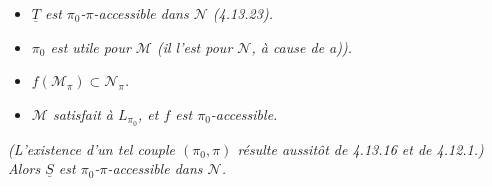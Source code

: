 \begin{itemize}[leftmargin=2.5em]
\item[\textit{a)}] \textit{$\underline{T}$ est $\pi_0$-$\pi$-accessible dans $\mathcal{N}$ (4.13.23).}
\item[\textit{b)}] \textit{$\pi_0$ est utile pour $\mathcal{M}$ (il l'est pour $\mathcal{N}$, à cause de a)).}
\item[\textit{c)}] \textit{$f(\mathcal{M}_\pi)\subset\mathcal{N}_\pi$.}
\item[\textit{d)}] \textit{$\mathcal{M}$ satisfait à $L_{\pi_0}$, et $f$ est $\pi_0$-accessible.}
\end{itemize}
\textit{(L'existence d'un tel couple $(\pi_0,\pi)$ résulte aussitôt de 4.13.16 et de 4.12.1.) Alors $\underline{S}$ est $\pi_0$-$\pi$-accessible dans $\mathcal{N}$.}

